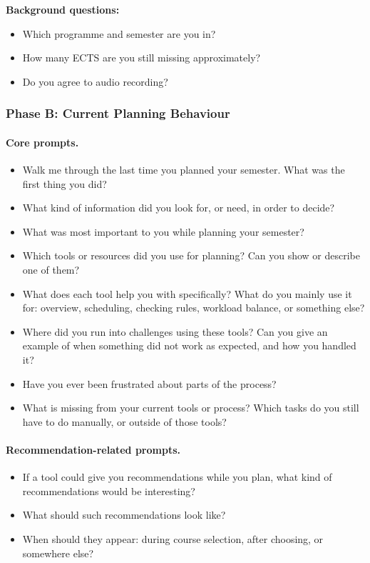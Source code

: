 \noindent
\textbf{Background questions:}
\begin{itemize}
    \item Which programme and semester are you in?
    \item How many ECTS are you still missing approximately?
    \item Do you agree to audio recording?
\end{itemize}

\subsubsection{Phase B: Current Planning Behaviour}

\paragraph{Core prompts.}
\begin{itemize}
    \item Walk me through the last time you planned your semester. What was the first thing you did?
    \item What kind of information did you look for, or need, in order to decide?
    \item What was most important to you while planning your semester?
    \item Which tools or resources did you use for planning? Can you show or describe one of them?
    \item What does each tool help you with specifically? What do you mainly use it for: overview, scheduling, checking rules, workload balance, or something else?
    \item Where did you run into challenges using these tools? Can you give an example of when something did not work as expected, and how you handled it?
    \item Have you ever been frustrated about parts of the process?
    \item What is missing from your current tools or process? Which tasks do you still have to do manually, or outside of those tools?
\end{itemize}


\paragraph{Recommendation-related prompts.}
\begin{itemize}
    \item If a tool could give you recommendations while you plan, what kind of recommendations would be interesting?
    \item What should such recommendations look like?
    \item When should they appear: during course selection, after choosing, or somewhere else?
\end{itemize}

